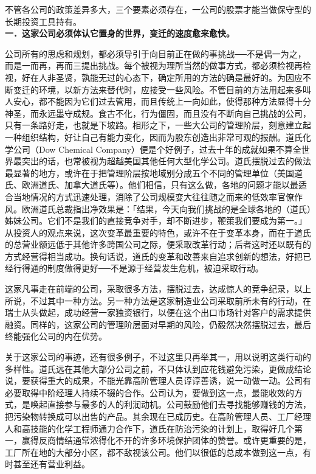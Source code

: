 \documentclass[UTF8,a4paper,zihao=-4,fontset = windows]{ctexart} %
\begin{document}
不管各公司的政策差异多大，三个要素必须存在，一公司的股票才能当做保守型的长期投资工具持有。
\\

\textbf{一．这家公司必须体认它置身的世界，变迁的速度愈来愈快。}


公司所有的思虑和规划，都必须导引于向目前正在做的事挑战──不是偶一为之，而是一而再，再而三提出挑战。每个被视为理所当然的做事方式，都必须检视再检视，好在人非圣贤，孰能无过的心态下，确定所用的方法的确是最好的。为因应不断变迁的环境，以新方法来替代时，应接受一些风险。不管目前的方法用起来多叫人安心，都不能因为它们过去管用，而且传统上一向如此，使得那种方法显得十分神圣，而永远墨守成规。食古不化，行为僵固，而且没有不断向自己挑战的公司，只有一条路好走，也就是下坡路。相形之下，一些大公司的管理阶层，刻意建立起一种组织结构，好让自己有能力变化，因而为股东创造出非常可观的报酬。道氏化学公司（Dow Chemical Company）便是个好例子，过去十年的成就如果不算全世界最突出的话，也常被视为超越美国其他任何大型化学公司。道氏摆脱过去的做法最显著的地方，或许在于把管理阶层按地域别分成五个不同的管理单位（美国道氏、欧洲道氏、加拿大道氏等）。他们相信，只有这么做，各地的问题才能以最适合当地情况的方式迅速处理，消除了公司规模变大往往随之而来的低效率官僚作风。欧洲道氏总裁指出净效果是：「结果，今天向我们挑战的是全球各地的（道氏）姊妹公司。它们不是我们的直接竞争对手，却不断进步，鞭策我们要成为第一。」从投资人的观点来说，这次变革最重要的特色，或许不在于变革本身，而在于道氏的总营业额远低于其他许多跨国公司之际，便采取改革行动；后者这时还以既有的方式经营得相当成功。换句话说，道氏的变革和改善来自追求创新的想法，好把已经行得通的制度做得更好──不是源于经营发生危机，被迫采取行动。

这家凡事走在前端的公司，采取很多方法，摆脱过去，达成惊人的竞争纪录，以上所说，不过其中一种方法。另一种方法是这家制造业公司采取前所未有的行动，在瑞士从头做起，成功经营一家独资银行，以便在这个出口市场针对客户的需求提供融资。同样的，这家公司的管理阶层面对早期的风险，仍毅然决然摆脱过去，最后终能强化公司的内在优势。

关于这家公司的事迹，还有很多例子，不过这里只再举其一，用以说明这类行动的多样性。道氏远在其他大部分公司之前，不只体认到应花钱避免污染，更做成结论说，要获得重大的成果，不能光靠高阶管理人员谆谆善诱，说一动做一动。公司有必要取得中阶经理人持续不辍的合作。公司认为，要做到这一点，最能收效的方式，是唤起直接参与最多的人的利润动机。公司鼓励他们去寻找能够赚钱的方法，把污染物转换成可以出售的产品。其余现在已成历史。在高阶管理人员、工厂经理人和高技能的化学工程师通力合作下，道氏在防治污染的计划上，取得好几个第一，赢得反商情结通常浓得化不开的许多环境保护团体的赞誉。或许更重要的是，工厂所在地的大部分小区，都不敌视该公司。他们以很低的总成本做到这一点，有时甚至还有营业利益。
\\
\end{document}
